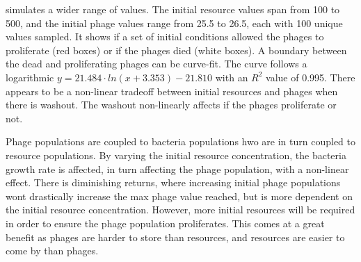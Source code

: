  simulates a wider range of values. 
The initial resource values span from 100 to 500, and the initial phage values range from 25.5 to 26.5, each with 100 unique values sampled.
It shows if a set of initial conditions allowed the phages to proliferate (red boxes) or if the phages died (white boxes). 
A boundary between the dead and proliferating phages can be curve-fit. 
The curve follows a logarithmic $y=21.484\cdot ln(x+3.353)-21.810$ with an $R^2$ value of 0.995. 
There appears to be a non-linear tradeoff between initial resources and phages when there is washout. 
The washout non-linearly affects if the phages proliferate or not. 

Phage populations are coupled to bacteria populations hwo are in turn coupled to resource populations. 
By varying the initial resource concentration, the bacteria growth rate is affected, in turn affecting the phage population, with a non-linear effect. 
There is diminishing returns, where increasing initial phage populations wont drastically increase the max phage value reached, but is more dependent on the initial resource concentration. 
However, more initial resources will be required in order to ensure the phage population proliferates. 
This comes at a great benefit as phages are harder to store than resources, and resources are easier to come by than phages. 


